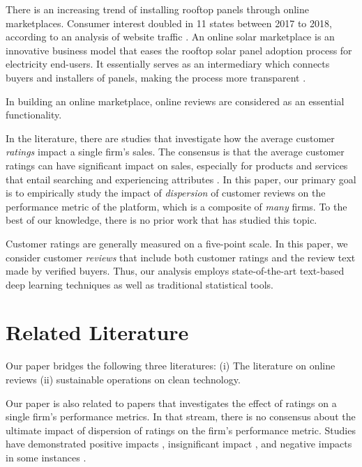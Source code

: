 \documentclass[msom,blindrev]{informs3}
\begin{document}
There is an increasing trend of installing rooftop panels through online marketplaces. Consumer interest doubled in 11 states between 2017 to 2018, according to an analysis of website traffic \citep{energysageintel19}.
An online solar marketplace is an innovative business model that eases the rooftop solar panel adoption process for electricity end-users. It essentially serves as an intermediary which connects buyers and installers of panels, making the process more transparent \citep{dorsey2019access}.

In building an online marketplace, online reviews are considered as an essential functionality.

In the literature, there are studies that investigate how the average customer \emph{ratings} impact a single firm's sales. The consensus is that the average customer ratings can have significant impact on sales, especially for products and services that entail searching and experiencing attributes \citep{zimmermann2018decomposing}. In this paper, our primary goal is to empirically study the impact of \emph{dispersion} of customer reviews on the performance metric of the platform, which is a composite of \emph{many} firms. To the best of our knowledge, there is no prior work that has studied this topic.

Customer ratings are generally measured on a five-point scale. In this paper, we consider customer \emph{reviews} that include both customer ratings and the review text made by verified buyers. Thus, our analysis employs state-of-the-art text-based deep learning techniques as well as traditional statistical tools.



\section{Related Literature}


Our paper bridges the following three literatures: (i) The literature on online reviews (ii) sustainable operations on clean technology.


Our paper is also related to papers that investigates the effect of ratings on a single firm's performance metrics. In that stream, there is no consensus about the ultimate impact of dispersion of ratings on the firm's performance metric. Studies have demonstrated positive impacts \citep{chintagunta2010effects,chevalier2006effect,dellarocas2007exploring}, insignificant impact \citep{duan2008online}, and negative impacts in some instances \citep{wang2015user}.
\end{document}
